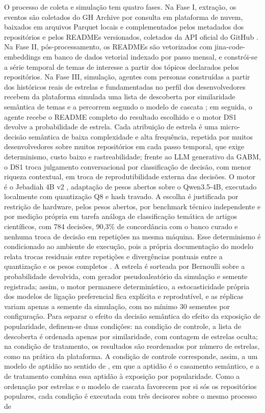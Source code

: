 \documentclass[12pt,oneside,a4paper,brazil,sumario=tradicional]{abntex2}
\begin{document}
O processo de coleta e simulação tem quatro fases. Na Fase I, extração, os eventos são coletados do GH Archive \parencite{grigorik_gharchive} por consulta em plataforma de nuvem, baixados em arquivos Parquet locais e complementados pelos metadados dos repositórios e pelos READMEs versionados, coletados da API oficial do GitHub \parencite{github2025}. Na Fase II, pós-processamento, os READMEs são vetorizados com jina-code-embeddings \parencite{kryvosheieva2025} em banco de dados vetorial indexado por passo mensal, e constrói-se a série temporal de temas de interesse a partir dos tópicos declarados pelos repositórios. Na Fase III, simulação, agentes com personas construídas a partir dos históricos reais de estrelas e fundamentadas no perfil dos desenvolvedores \parencite{borges2018, stackoverflow2025} recebem da plataforma simulada uma lista de descoberta por similaridade semântica de temas e a percorrem segundo o modelo de cascata \parencite{craswell2008}; em seguida, o agente recebe o README completo do resultado escolhido e o motor DS1 devolve a probabilidade de estrela. Cada atribuição de estrela é uma micro-decisão semântica de baixa complexidade e alta frequência, repetida por muitos desenvolvedores sobre muitos repositórios em cada passo temporal, que exige determinismo, custo baixo e rastreabilidade; frente ao LLM generativo da GABM, o DS1 troca julgamento conversacional por classificação de decisão, com menor riqueza contextual, em troca de reprodutibilidade externa das decisões. O motor é o Jebadiah 4B v2 \parencite{frontierinfra2026}, adaptação de pesos abertos sobre o Qwen3.5-4B, executado localmente com quantização Q8 e hash travado. A escolha é justificada por restrição de hardware, pelos pesos abertos, por benchmark técnico independente \parencite{akita2026} e por medição própria em tarefa análoga de classificação temática de artigos científicos, com 784 decisões, 90,3\% de concordância com o banco curado e nenhuma troca de decisão em repetições na mesma máquina. Esse determinismo é condicionado ao ambiente de execução, pois a própria documentação do modelo relata trocas residuais entre repetições e divergências pontuais entre a quantização e os pesos completos \parencite{frontierinfra2026}. A estrela é sorteada por Bernoulli sobre a probabilidade devolvida, com gerador pseudoaleatório da simulação e semente registrada; assim, o motor permanece determinístico, a estocasticidade própria dos modelos de ligação preferencial fica explícita e reprodutível, e as réplicas variam apenas a semente da simulação, com no mínimo 30 sementes por configuração. Para separar o efeito da decisão semântica do efeito da exposição de popularidade, definem-se duas condições: na condição de controle, a lista de descoberta é ordenada apenas por similaridade, com contagem de estrelas oculta; na condição de tratamento, os resultados são reordenados por número de estrelas, como na prática da plataforma. A condição de controle corresponde, assim, a um modelo de aptidão no sentido de \textcite{bianconi2001}, em que a aptidão é o casamento semântico, e a de tratamento combina essa aptidão à exposição por popularidade. Como a ordenação por estrelas e o modelo de cascata favorecem por si sós os repositórios populares, cada condição é executada com três decisores sobre o mesmo processo de 
\end{document}
